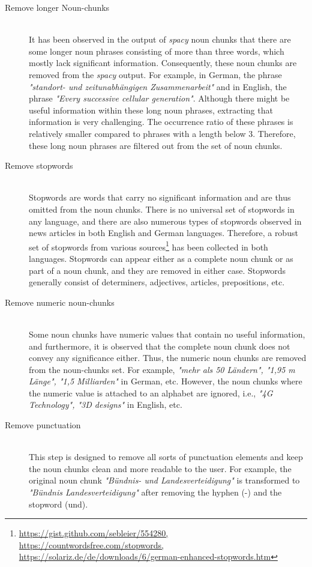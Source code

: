  
 \begin{description}
 	\item[Remove longer Noun-chunks] \hfill \\  It has been observed in the output of \textit{spacy} noun chunks that there are some longer noun phrases consisting of more than three words, which mostly lack significant information. Consequently, these noun chunks are removed from the \textit{spacy} output. For example, in German, the phrase \textit{"standort- und zeitunabhängigen Zusammenarbeit"} and in English, the phrase \textit{"Every successive cellular generation"}. Although there might be useful information within these long noun phrases, extracting that information is very challenging. The occurrence ratio of these phrases is relatively smaller compared to phrases with a length below 3. Therefore, these long noun phrases are filtered out from the set of noun chunks.
 	
 	\item[Remove stopwords] \hfill \\  Stopwords are words that carry no significant information and are thus omitted from the noun chunks. There is no universal set of stopwords in any language, and there are also numerous types of stopwords observed in news articles in both English and German languages. Therefore, a robust set of stopwords from various sources\footnote{\url{https://gist.github.com/sebleier/554280, https://countwordsfree.com/stopwords, https://solariz.de/de/downloads/6/german-enhanced-stopwords.htm}} has been collected in both languages. Stopwords can appear either as a complete noun chunk or as part of a noun chunk, and they are removed in either case. Stopwords generally consist of determiners, adjectives, articles, prepositions, etc.
 	
 	
 	\item[Remove numeric noun-chunks] \hfill \\  Some noun chunks have numeric values that contain no useful information, and furthermore, it is observed that the complete noun chunk does not convey any significance either. Thus, the numeric noun chunks are removed from the noun-chunks set. For example, \textit{"mehr als 50 Ländern", "1,95 m Länge", "1,5 Milliarden"} in German, etc. However, the noun chunks where the numeric value is attached to an alphabet are ignored, i.e., \textit{"4G Technology", "3D designs"} in English, etc.
 	
 	
 	\item[Remove punctuation]  \hfill \\ This step is designed to remove all sorts of punctuation elements and keep the noun chunks clean and more readable to the user. For example, the original noun chunk \textit{"Bündnis- und Landesverteidigung"} is transformed to \textit{"Bündnis Landesverteidigung"} after removing the hyphen (-) and the stopword (und).
 	

\end{description}
